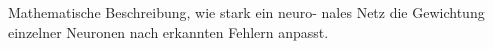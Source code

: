 \documentclass[preview]{standalone}
\begin{document}
\begin{center}
Mathematische Beschreibung, wie stark ein neuro- \linebreak nales Netz die Gewichtung einzelner Neuronen nach erkannten Fehlern anpasst.
\end{center}
\end{document}

